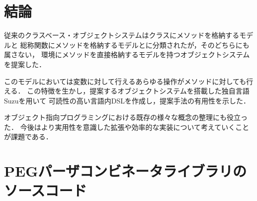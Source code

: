 \documentclass{ipsjprosym}
\begin{document}
\section{結論}

従来のクラスベース・オブジェクトシステムはクラスにメソッドを格納するモデルと
総称関数にメソッドを格納するモデルとに分類されたが，そのどちらにも属さない，
環境にメソッドを直接格納するモデルを持つオブジェクトシステムを提案した．

このモデルにおいては変数に対して行えるあらゆる操作がメソッドに対しても行える．
この特徴を生かし，提案するオブジェクトシステムを搭載した独自言語Suzuを用いて
可読性の高い言語内DSLを作成し，提案手法の有用性を示した．

オブジェクト指向プログラミングにおける既存の様々な概念の整理にも役立った．
今後はより実用性を意識した拡張や効率的な実装について考えていくことが課題である．






\onecolumn

\appendix

\section{PEGパーザコンビネータライブラリのソースコード}
\label{sec:peg-source}
\end{document}
